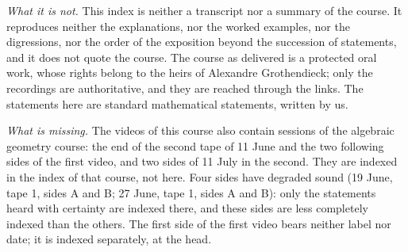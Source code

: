 \documentclass[11pt]{article}
\begin{document}
\emph{What it is not.} This index is neither a transcript nor a summary of the course. It reproduces neither the explanations, nor the worked examples, nor the digressions, nor the order of the exposition beyond the succession of statements, and it does not quote the course. The course as delivered is a protected oral work, whose rights belong to the heirs of Alexandre Grothendieck; only the recordings are authoritative, and they are reached through the links. The statements here are standard mathematical statements, written by us.

\emph{What is missing.} The videos of this course also contain sessions of the algebraic geometry course: the end of the second tape of 11 June and the two following sides of the first video, and two sides of 11 July in the second. They are indexed in the index of that course, not here. Four sides have degraded sound (19 June, tape 1, sides A and B; 27 June, tape 1, sides A and B): only the statements heard with certainty are indexed there, and these sides are less completely indexed than the others. The first side of the first video bears neither label nor date; it is indexed separately, at the head.
\end{document}
